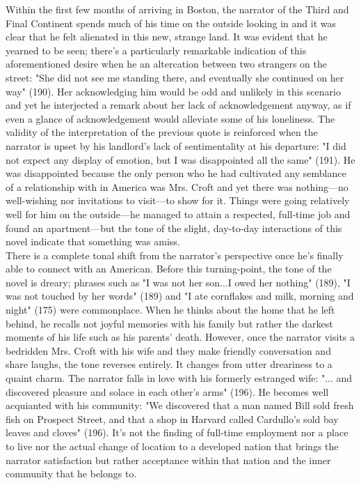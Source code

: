\documentclass[12pt]{article}
\begin{document}


Within the first few months of arriving in Boston, the narrator of the Third and Final Continent spends much of his time on the outside looking in and it was clear that he felt alienated in this new, strange land. It was evident that he yearned to be seen; there's a particularly remarkable indication of this aforementioned desire when he an altercation between two strangers on the street: "She did not see me standing there, and eventually she continued on her way" (190). Her acknowledging him would be odd and unlikely in this scenario and yet he interjected a remark about her lack of acknowledgement anyway, as if even
a glance of acknowledgement would alleviate some of his loneliness. The validity of the interpretation of the previous quote is reinforced when the narrator is upset by his landlord's lack of sentimentality at his departure: "I did not expect any display of emotion, but I was disappointed all the same" (191). He was disappointed because the only person who he had cultivated any semblance of a relationship with in America was Mrs. Croft and yet there was nothing---no well-wishing nor invitations to visit---to show for it. Things were going relatively well for him on the outside---he managed to attain a respected, full-time job and found
an apartment---but the tone of the slight, day-to-day interactions of this novel indicate that something was amiss. \\

There is a complete tonal shift from the narrator's perspective once he's finally able to connect with an American. Before this
turning-point, the tone of the novel is dreary; phrases such as "I was not her son...I owed her nothing" (189), "I was not touched
by her words" (189) and "I ate cornflakes and milk, morning and night" (175) were commonplace. When he thinks about
the home that he left behind, he recalls not joyful memories with his family but rather the darkest moments of his life 
such as his parents' death. However, once the narrator visits a bedridden Mrs. Croft with his wife and they make friendly conversation and share laughs, the tone reverses entirely. It changes from utter dreariness to a quaint charm. The narrator
falls in love with his formerly estranged wife: "... and discovered pleasure and solace in each other's arms" (196). He
becomes well acquianted with his community: "We discovered that a man named Bill sold fresh fish on Prospect Street, and that
a shop in Harvard called Cardullo's sold bay leaves and cloves" (196). It's not the finding of full-time employment
nor a place to live nor the actual change of location to a developed nation that brings the narrator satisfaction but rather
acceptance within that nation and the inner community that he belongs to.
\end{document}
